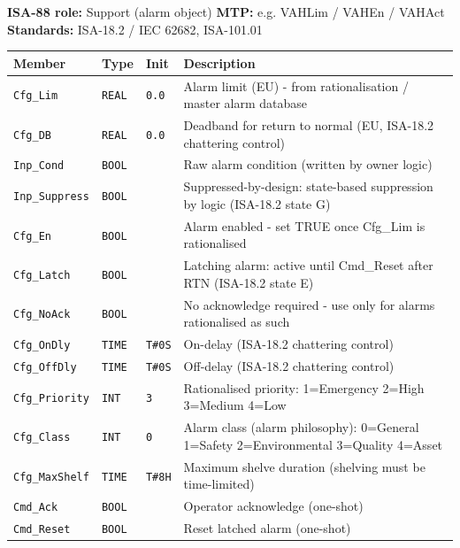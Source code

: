 {\small\textbf{ISA-88 role:} Support (alarm object) \quad \textbf{MTP:} e.g. VAHLim /\allowbreak{} VAHEn /\allowbreak{} VAHAct \quad \textbf{Standards:} ISA-18.2 /\allowbreak{} IEC 62682, ISA-101.01}
{\footnotesize
\begin{longtable}{@{}>{\raggedright\arraybackslash}p{3.4cm}>{\raggedright\arraybackslash}p{3.3cm}>{\raggedright\arraybackslash}p{1.3cm}>{\raggedright\arraybackslash}p{6.4cm}@{}}
\toprule
\rowcolor{tblhead}\textbf{Member} & \textbf{Type} & \textbf{Init} & \textbf{Description} \\
\midrule
\endhead
\texttt{Cfg\_Lim} & \texttt{REAL} & \texttt{0.0} & Alarm limit (EU) - from rationalisation /\allowbreak{} master alarm database \\
\texttt{Cfg\_DB} & \texttt{REAL} & \texttt{0.0} & Deadband for return to normal (EU, ISA-18.2 chattering control) \\
\texttt{Inp\_Cond} & \texttt{BOOL} &  & Raw alarm condition (written by owner logic) \\
\texttt{Inp\_Suppress} & \texttt{BOOL} &  & Suppressed-by-design: state-based suppression by logic (ISA-18.2 state G) \\
\texttt{Cfg\_En} & \texttt{BOOL} &  & Alarm enabled - set TRUE once Cfg\_Lim is rationalised \\
\texttt{Cfg\_Latch} & \texttt{BOOL} &  & Latching alarm: active until Cmd\_Reset after RTN (ISA-18.2 state E) \\
\texttt{Cfg\_NoAck} & \texttt{BOOL} &  & No acknowledge required - use only for alarms rationalised as such \\
\texttt{Cfg\_OnDly} & \texttt{TIME} & \texttt{T\#0S} & On-delay (ISA-18.2 chattering control) \\
\texttt{Cfg\_OffDly} & \texttt{TIME} & \texttt{T\#0S} & Off-delay (ISA-18.2 chattering control) \\
\texttt{Cfg\_Priority} & \texttt{INT} & \texttt{3} & Rationalised priority: 1=Emergency 2=High 3=Medium 4=Low \\
\texttt{Cfg\_Class} & \texttt{INT} & \texttt{0} & Alarm class (alarm philosophy): 0=General 1=Safety 2=Environmental 3=Quality 4=Asset \\
\texttt{Cfg\_MaxShelf} & \texttt{TIME} & \texttt{T\#8H} & Maximum shelve duration (shelving must be time-limited) \\
\texttt{Cmd\_Ack} & \texttt{BOOL} &  & Operator acknowledge (one-shot) \\
\texttt{Cmd\_Reset} & \texttt{BOOL} &  & Reset latched alarm (one-shot) \\

\end{longtable}}
